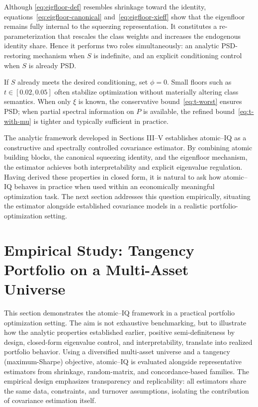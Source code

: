 \documentclass[12pt,letterpaper]{article}
\begin{document}
Although \eqref{eq:eigfloor-def} resembles shrinkage toward the identity, equations~\eqref{eq:eigfloor-canonical} and~\eqref{eq:eigfloor-xieff} show that the eigenfloor remains fully internal to the squeezing representation.  It constitutes a re-parameterization that rescales the class weights and increases the endogenous identity share.  Hence it performs two roles simultaneously: an analytic PSD-restoring mechanism when \(S\) is indefinite, and an explicit conditioning control when \(S\) is already PSD.

If \(S\) already meets the desired conditioning, set \(\phi=0\).  Small floors such as \(t\in[0.02,0.05]\) often stabilize optimization without materially altering class semantics.  When only \(\xi\) is known, the conservative bound~\eqref{eq:t-worst} ensures PSD; when partial spectral information on \(P\) is available, the refined bound~\eqref{eq:t-with-mu} is tighter and typically sufficient in practice.

\medskip
The analytic framework developed in Sections III–V establishes atomic–IQ as a constructive and spectrally controlled covariance estimator. By combining atomic building blocks, the canonical squeezing identity, and the eigenfloor mechanism, the estimator achieves both interpretability and explicit eigenvalue regulation. Having derived these properties in closed form, it is natural to ask how atomic–IQ behaves in practice when used within an economically meaningful optimization task. The next section addresses this question empirically, situating the estimator alongside established covariance models in a realistic portfolio-optimization setting.

\section{Empirical Study: Tangency Portfolio on a Multi-Asset Universe}
\label{sec:method}

This section demonstrates the atomic–IQ framework in a practical portfolio optimization setting. The aim is not exhaustive benchmarking, but to illustrate how the analytic properties established earlier, positive semi-definiteness by design, closed-form eigenvalue control, and interpretability, translate into realized portfolio behavior. Using a diversified multi-asset universe and a tangency (maximum-Sharpe) objective, atomic–IQ is evaluated alongside representative estimators from shrinkage, random-matrix, and concordance-based families. The empirical design emphasizes transparency and replicability: all estimators share the same data, constraints, and turnover assumptions, isolating the contribution of covariance estimation itself.
\end{document}
